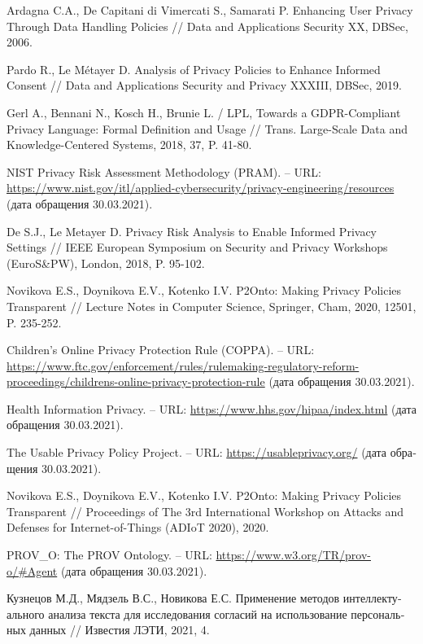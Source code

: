 \documentclass[../main]{subfiles}
\begin{document}
\begin{english}
\begin{biblenum}
     Ardagna C.A., De Capitani di Vimercati S., Samarati P. Enhancing User Privacy Through Data Handling Policies // Data and Applications Security XX, DBSec, 2006. 

     Pardo R., Le Métayer D. Analysis of Privacy Policies to Enhance Informed Consent // Data and Applications Security and Privacy XXXIII, DBSec, 2019. 

     Gerl A., Bennani N., Kosch H., Brunie L. / LPL, Towards a GDPR-Compliant Privacy Language: Formal Definition and Usage // Trans. Large-Scale Data and Knowledge-Centered Systems, 2018, 37, P. 41-80. 

     NIST Privacy Risk Assessment Methodology (PRAM). -- URL: \url{https://www.nist.gov/itl/applied-cybersecurity/privacy-engineering/resources} (\textrussian{дата обращения} 30.03.2021).

     De S.J., Le Metayer D.  Privacy Risk Analysis to Enable Informed Privacy Settings // IEEE European Symposium on Security and Privacy Workshops (EuroS\&PW), London, 2018, P. 95-102. 

     Novikova E.S., Doynikova E.V., Kotenko I.V. P2Onto: Making Privacy Policies Transparent // Lecture Notes in Computer Science, Springer, Cham, 2020, 12501, P. 235-252.

     Children's Online Privacy Protection Rule (COPPA). -- URL: \url{https://www.ftc.gov/enforcement/rules/rulemaking-regulatory-reform-proceedings/childrens-online-privacy-protection-rule} (\textrussian{дата обращения} 30.03.2021). 

     Health Information Privacy. -- URL: \url{https://www.hhs.gov/hipaa/index.html} (\textrussian{дата обращения} 30.03.2021).

     The Usable Privacy Policy Project. -- URL: \url{https://usableprivacy.org/} (\textrussian{дата обращения} 30.03.2021).

     Novikova E.S., Doynikova E.V., Kotenko I.V. P2Onto: Making Privacy Policies Transparent // Proceedings of The 3rd International Workshop on Attacks and Defenses for Internet-of-Things (ADIoT 2020), 2020.

    \newpage

     PROV\_O: The PROV Ontology. -- URL: \url{https://www.w3.org/TR/prov-o/#Agent} (\textrussian{дата обращения} 30.03.2021).

     \textrussian{Кузнецов М.Д., Мядзель В.С., Новикова Е.С. Применение методов интеллектуального анализа текста для исследования согласий на использование персональных данных // Известия ЛЭТИ, 2021, 4.}


\end{biblenum}
\end{english}
\end{document}
